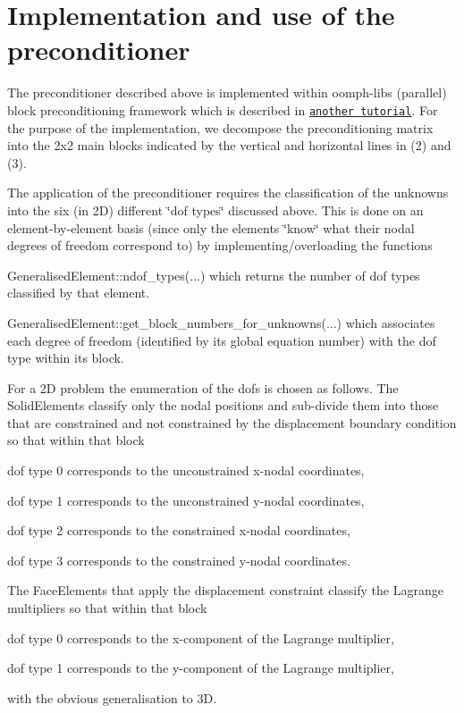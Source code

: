  

\hypertarget{index_implementation}{}\section{Implementation and use of the preconditioner}\label{index_implementation}
The preconditioner described above is implemented within {\ttfamily oomph-\/lib\textquotesingle{}s} (parallel) block preconditioning framework which is described in \href{../../../mpi/block_preconditioners/html/index.html}{\tt another tutorial}. For the purpose of the implementation, we decompose the preconditioning matrix into the 2x2 main blocks indicated by the vertical and horizontal lines in (2) and (3).

The application of the preconditioner requires the classification of the unknowns into the six (in 2D) different \char`\"{}dof types\char`\"{} discussed above. This is done on an element-\/by-\/element basis (since only the elements \char`\"{}know\char`\"{} what their nodal degrees of freedom correspond to) by implementing/overloading the functions
\begin{DoxyItemize}
\item {\ttfamily Generalised\+Element\+::ndof\+\_\+types}(...) which returns the number of dof types classified by that element.
\item {\ttfamily Generalised\+Element\+::get\+\_\+block\+\_\+numbers\+\_\+for\+\_\+unknowns}(...) which associates each degree of freedom (identified by its global equation number) with the dof type within its block. ~\newline
~\newline

\end{DoxyItemize}For a 2D problem the enumeration of the dofs is chosen as follows. The {\ttfamily Solid\+Elements} classify only the nodal positions and sub-\/divide them into those that are constrained and not constrained by the displacement boundary condition so that within that block
\begin{DoxyItemize}
\item dof type 0 corresponds to the unconstrained x-\/nodal coordinates,
\item dof type 1 corresponds to the unconstrained y-\/nodal coordinates,
\item dof type 2 corresponds to the constrained x-\/nodal coordinates,
\item dof type 3 corresponds to the constrained y-\/nodal coordinates.
\end{DoxyItemize}The {\ttfamily Face\+Elements} that apply the displacement constraint classify the Lagrange multipliers so that within that block
\begin{DoxyItemize}
\item dof type 0 corresponds to the x-\/component of the Lagrange multiplier,
\item dof type 1 corresponds to the y-\/component of the Lagrange multiplier,
\end{DoxyItemize}with the obvious generalisation to 3D.



